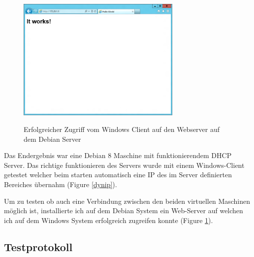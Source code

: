 \documentclass[12pt,a4paper,twoside,titlepage]{article}
\begin{document}
        \begin{figure}
	      \hrulefill\\
	      \center
          \includegraphics[width=8cm]{ie_web_example}
          \caption{\label{webserver} Erfolgreicher Zugriff vom Windows Client auf den Webserver auf dem Debian Server}
          \hrulefill
        \end{figure}
        
        Das Endergebnis war eine Debian 8 Maschine mit funktionierendem DHCP Server. Das richtige funktionieren des Servers wurde mit einem Windows-Client getestet welcher beim starten automatisch eine IP des im Server definierten Bereiches übernahm (Figure \ref{dynip}).

        Um zu testen ob auch eine Verbindung zwischen den beiden virtuellen Maschinen möglich ist, installierte ich auf dem Debian System ein Web-Server auf welchen ich auf dem Windows System erfolgreich zugreifen konnte (Figure \ref{webserver}).

        \subsection{Testprotokoll}
\end{document}
